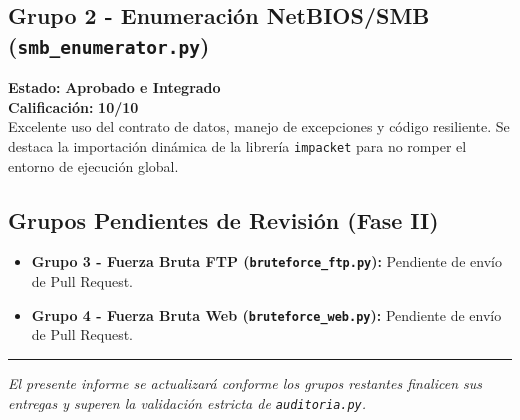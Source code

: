 \documentclass[12pt,a4paper]{article}
\begin{document}
\subsection*{Grupo 2 - Enumeración NetBIOS/SMB (\texttt{smb\_enumerator.py})}
\textbf{Estado:} \textcolor{green!70!black}{\textbf{Aprobado e Integrado}} \\
\textbf{Calificación:} \textbf{10/10} \\
Excelente uso del contrato de datos, manejo de excepciones y código resiliente. Se destaca la importación dinámica de la librería \texttt{impacket} para no romper el entorno de ejecución global.

\subsection*{Grupos Pendientes de Revisión (Fase II)}
\begin{itemize}[label=$\bullet$]
    \item \textbf{Grupo 3 - Fuerza Bruta FTP (\texttt{bruteforce\_ftp.py}):} Pendiente de envío de Pull Request.
    \item \textbf{Grupo 4 - Fuerza Bruta Web (\texttt{bruteforce\_web.py}):} Pendiente de envío de Pull Request.
\end{itemize}

\vspace{1cm}
\hrule
\vspace{0.5cm}
\noindent \textit{El presente informe se actualizará conforme los grupos restantes finalicen sus entregas y superen la validación estricta de \texttt{auditoria.py}.}
\end{document}
